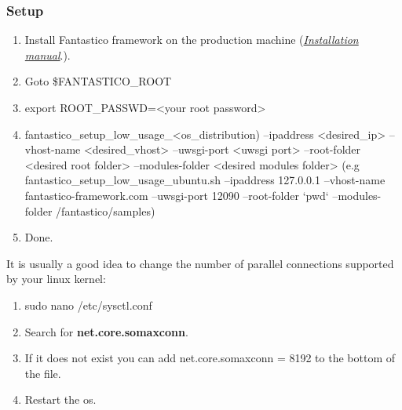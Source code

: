 \documentclass[letterpaper,10pt,english]{sphinxmanual}
\begin{document}
\subsubsection{Setup}
\label{how_to/deployment/low_usage_scenario:setup}\begin{enumerate}
\item {} 
Install Fantastico framework on the production machine ({\hyperref[get_started/installation::doc]{\emph{Installation manual}}}.).

\item {} 
Goto \$FANTASTICO\_ROOT

\item {} 
export ROOT\_PASSWD=\textless{}your root password\textgreater{}

\item {} 
fantastico\_setup\_low\_usage\_\textless{}os\_distribution) --ipaddress \textless{}desired\_ip\textgreater{} --vhost-name \textless{}desired\_vhost\textgreater{} --uwsgi-port \textless{}uwsgi port\textgreater{} --root-folder \textless{}desired root folder\textgreater{} --modules-folder \textless{}desired modules folder\textgreater{} (e.g fantastico\_setup\_low\_usage\_ubuntu.sh --ipaddress 127.0.0.1 --vhost-name fantastico-framework.com --uwsgi-port 12090 --root-folder {}`pwd{}` --modules-folder /fantastico/samples)

\item {} 
Done.

\end{enumerate}

It is usually a good idea to change the number of parallel connections supported by your linux kernel:
\begin{enumerate}
\item {} 
sudo nano /etc/sysctl.conf

\item {} 
Search for \textbf{net.core.somaxconn}.

\item {} 
If it does not exist you can add net.core.somaxconn = 8192 to the bottom of the file.

\item {} 
Restart the os.

\end{enumerate}
\end{document}
